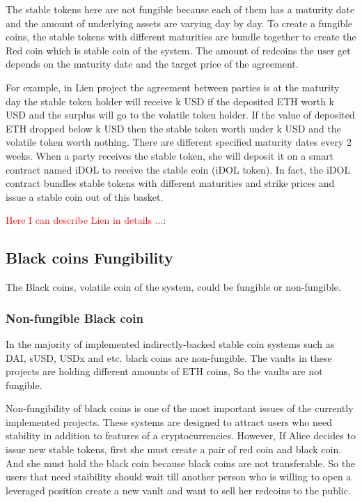 The stable tokens here are not fungible because each of them has a maturity date and the amount of underlying assets are varying day by day. To create a fungible coins, the stable tokens with different maturities are bundle together to create the Red coin which is stable coin of the system. The amount of redcoins the user get depends on the maturity date and the target price of the agreement.

For example, in Lien project the agreement between parties is at the maturity day the stable token holder will receive k USD if the deposited ETH worth k USD and the surplus will go to the volatile token holder. If the value of deposited ETH dropped below k USD then the stable token worth under k USD and the volatile token worth nothing. There are different specified maturity dates every 2 weeks. When a party receives the stable token, she will deposit it on a smart contract named iDOL to receive the stable coin (iDOL token). In fact, the iDOL contract bundles stable tokens with different maturities and strike prices and issue a stable coin out of this basket.

\textcolor{red}{Here I can describe Lien in details ...}:


\subsection{Black coins Fungibility}

The Black coins, volatile coin of the system, could be fungible or non-fungible. 

\subsubsection{Non-fungible Black coin}

In the majority of implemented indirectly-backed stable coin systems such as DAI, sUSD, USDx and etc. black coins are non-fungible. The vaults in these projects are holding different amounts of ETH coins, So the vaults are not fungible. 

Non-fungibility of black coins is one of the most important issues of the currently implemented projects. These systems are designed to attract users who need stability in addition to features of a cryptocurrencies. However, If Alice decides to issue new stable tokens, first she must create a pair of red coin and black coin. And she must hold the black coin because black coins are not transferable. So the users that need staibility should wait till another person who is willing to open a leveraged position create a new vault and want to sell her redcoins to the public.

